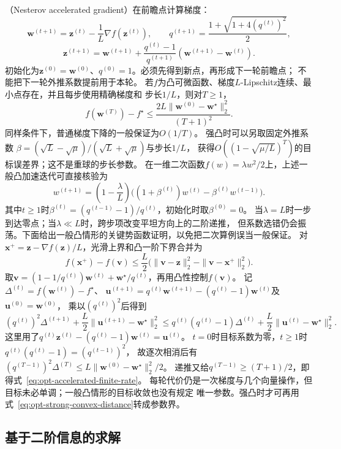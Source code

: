 （Nesterov accelerated gradient）在前瞻点计算梯度：
\[
 \bm w^{(t+1)}=\bm z^{(t)}-\frac1L\nabla f(\bm z^{(t)}),\qquad
 q^{(t+1)}=\frac{1+\sqrt{1+4(q^{(t)})^2}}2,
\]
\[
 \bm z^{(t+1)}=\bm w^{(t+1)}
 +\frac{q^{(t)}-1}{q^{(t+1)}}(\bm w^{(t+1)}-\bm w^{(t)}).
\]
初始化为$\bm z^{(0)}=\bm w^{(0)}$、$q^{(0)}=1$。必须先得到新点，再形成下一轮前瞻点；
不能把下一轮外推系数提前用于本轮。
若$f$为凸可微函数、梯度$L$-Lipschitz连续、最小点存在，并且每步使用精确梯度和
步长$1/L$，则对$T\geq1$，
\begin{equation}
 f(\bm w^{(T)})-f^\star
 \leq\frac{2L\|\bm w^{(0)}-\bm w^\star\|_2^2}{(T+1)^2}.
 \label{eq:opt-accelerated-finite-rate}
\end{equation}
同样条件下，普通梯度下降的一般保证为$O(1/T)$。
强凸时可以另取固定外推系数
$\beta=(\sqrt L-\sqrt\mu)/(\sqrt L+\sqrt\mu)$与步长$1/L$，
获得$O((1-\sqrt{\mu/L})^T)$的目标误差界；这不是重球的步长参数。
在一维二次函数$f(w)=\lambda w^2/2$上，上述一般凸加速迭代可直接核验为
\[
  w^{(t+1)}
  =\left(1-\frac{\lambda}{L}\right)
  \bigl((1+\beta^{(t)})w^{(t)}-\beta^{(t)} w^{(t-1)}\bigr).
\]
其中$t\geq1$时$\beta^{(t)}=(q^{(t-1)}-1)/q^{(t)}$，初始化时取$\beta^{(0)}=0$。
当$\lambda=L$时一步到达零点；当$\lambda\ll L$时，跨步项改变平坦方向上的二阶递推，
但系数选错仍会振荡。下面给出一般凸情形的关键势函数证明，以免把二次算例误当一般保证。
对$\bm x^+=\bm z-\nabla f(\bm z)/L$，光滑上界和凸一阶下界合并为
\[
 f(\bm x^+)-f(\bm v)
 \leq\frac L2\bigl(\|\bm v-\bm z\|_2^2-\|\bm v-\bm x^+\|_2^2\bigr).
\]
取$\bm v=(1-1/q^{(t)})\bm w^{(t)}+\bm w^\star/q^{(t)}$，再用凸性控制$f(\bm v)$。
记$\Delta^{(t)}=f(\bm w^{(t)})-f^\star$、
$\bm u^{(t+1)}=q^{(t)}\bm w^{(t+1)}-(q^{(t)}-1)\bm w^{(t)}$及$\bm u^{(0)}=\bm w^{(0)}$，
乘以$(q^{(t)})^2$后得到
\[
 (q^{(t)})^2\Delta^{(t+1)}+\frac L2\|\bm u^{(t+1)}-\bm w^\star\|_2^2
 \leq q^{(t)}(q^{(t)}-1)\Delta^{(t)}+\frac L2\|\bm u^{(t)}-\bm w^\star\|_2^2.
\]
这里用了$q^{(t)}\bm z^{(t)}-(q^{(t)}-1)\bm w^{(t)}=\bm u^{(t)}$。
$t=0$时目标系数为零，$t\geq1$时$q^{(t)}(q^{(t)}-1)=(q^{(t-1)})^2$，
故逐次相消后有$(q^{(T-1)})^2\Delta^{(T)}\leq L\|\bm w^{(0)}-\bm w^\star\|_2^2/2$。
递推又给$q^{(T-1)}\geq(T+1)/2$，即得式~\eqref{eq:opt-accelerated-finite-rate}。
每轮代价仍是一次梯度与几个向量操作，但目标未必单调；一般凸情形的目标收敛也没有规定
唯一参数。强凸时才可再用式~\eqref{eq:opt-strong-convex-distance}转成参数界。

\subsection{基于二阶信息的求解}
\label{sec:opt-second-order-methods}

